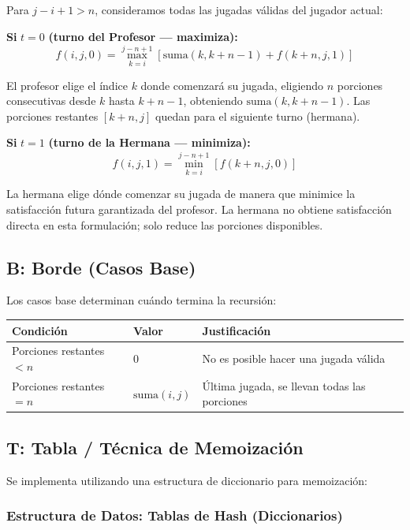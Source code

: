 \documentclass[12pt,letterpaper]{article}
\begin{document}
Para $j - i + 1 > n$, consideramos todas las jugadas válidas del jugador actual:

\textbf{Si } $t = 0$ \textbf{(turno del Profesor — maximiza):}
\[
f(i, j, 0) = \max_{k=i}^{j-n+1} \left[ \text{suma}(k, k+n-1) + f(k+n, j, 1) \right]
\]

El profesor elige el índice $k$ donde comenzará su jugada, eligiendo $n$ porciones consecutivas desde $k$ hasta $k+n-1$, obteniendo $\text{suma}(k, k+n-1)$. Las porciones restantes $[k+n, j]$ quedan para el siguiente turno (hermana).

\textbf{Si } $t = 1$ \textbf{(turno de la Hermana — minimiza):}
\[
f(i, j, 1) = \min_{k=i}^{j-n+1} \left[ f(k+n, j, 0) \right]
\]

La hermana elige dónde comenzar su jugada de manera que minimice la satisfacción futura garantizada del profesor. La hermana no obtiene satisfacción directa en esta formulación; solo reduce las porciones disponibles.

\subsection{B: Borde (Casos Base)}

Los casos base determinan cuándo termina la recursión:

\begin{table}[h]
\centering
\begin{tabular}{|p{3cm}|p{2.5cm}|p{5cm}|}
\hline
\textbf{Condición} & \textbf{Valor} & \textbf{Justificación} \\
\hline
Porciones restantes $< n$ & $0$ & No es posible hacer una jugada válida \\
\hline
Porciones restantes $= n$ & $\text{suma}(i, j)$ & Última jugada, se llevan todas las porciones \\
\hline
\end{tabular}
\end{table}

\subsection{T: Tabla / Técnica de Memoización}

Se implementa utilizando una estructura de diccionario para memoización:

\subsubsection{Estructura de Datos: Tablas de Hash (Diccionarios)}
\end{document}

